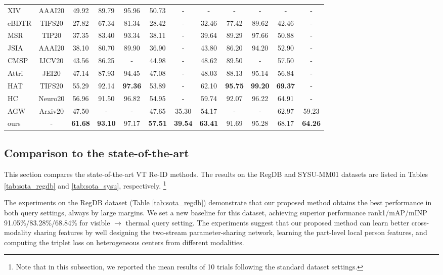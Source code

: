 \documentclass[journal]{IEEEtran}
\begin{document}
\begin{table*}
\begin{tabular}{l|c|c|c|c|c|c||c|c|c|c|c}
      XIV \cite{Li2020InfraredVisibleCP} & AAAI20 & 49.92 & 89.79 & 95.96 & 50.73 &- &  - & - & - & - & - \\
      eBDTR \cite{Ye2020DeepLF} & TIFS20 & 27.82 & 67.34 & 81.34 & 28.42 &- & 32.46 & 77.42 & 89.62 & 42.46 &- \\
      MSR \cite{Feng2020LearningMR} & TIP20 & 37.35 & 83.40 & 93.34 & 38.11 &- & 39.64 & 89.29 & 97.66 & 50.88 &- \\
      JSIA \cite{Wang2020CrossModalityPG} & AAAI20 & 38.10 & 80.70 & 89.90 & 36.90 &- & 43.80 & 86.20 & 94.20 & 52.90 &- \\
      CMSP \cite{wu2020rgb} & IJCV20 & 43.56  & 86.25 & - & 44.98 &- & 48.62  & 89.50 & -  & 57.50 &- \\
      Attri \cite{zhang20deepfl} & JEI20 & 47.14 & 87.93 & 94.45 & 47.08 & -& 48.03 & 88.13 & 95.14 & 56.84 &- \\
      HAT \cite{ye2018vipr} & TIFS20 & 55.29 & 92.14 & \textbf{97.36} & 53.89 & -& 62.10 & \textbf{95.75} & \textbf{99.20} & \textbf{69.37} &- \\
      HC \cite{zhu2019hetero} & Neuro20 & 56.96 & 91.50 & 96.82 & 54.95 &- & 59.74 & 92.07 & 96.22 & 64.91 &- \\
AGW \cite{Ye2020DeepLF} & Arxiv20 & 47.50 & - & - & 47.65 & 35.30 & 54.17 & - & -& 62.97 & 59.23 \\ \hline
      ours & - & \textbf{61.68}  & \textbf{93.10} & 97.17 & \textbf{57.51} & \textbf{39.54} & \textbf{63.41} & 91.69 & 95.28 & 68.17 & \textbf{64.26} \\
      \toprule[2pt]
  \end{tabular}
\end{table*}

\subsection{Comparison to the state-of-the-art}
\label{ssec:sota}

This section compares the state-of-the-art VT Re-ID methods. The results on the RegDB and SYSU-MM01 datasets are listed in Tables \ref{tab:sota_regdb} and \ref{tab:sota_sysu}, respectively. \footnote{Note that in this subsection, we reported the mean results of 10 trials following the standard dataset settings.}

The experiments on the RegDB dataset (Table \ref{tab:sota_regdb}) demonstrate that our proposed method obtains the best performance in both query settings, always by large margins. We set a new baseline for this dataset, achieving superior performance rank1/mAP/mINP 91.05\%/83.28\%/68.84\% for visible $\rightarrow$ thermal query setting. The experiments suggest that our proposed method can learn better cross-modality sharing features by well designing the two-stream parameter-sharing network, learning the part-level local person features, and computing the triplet loss on heterogeneous centers from different modalities.
\end{document}
